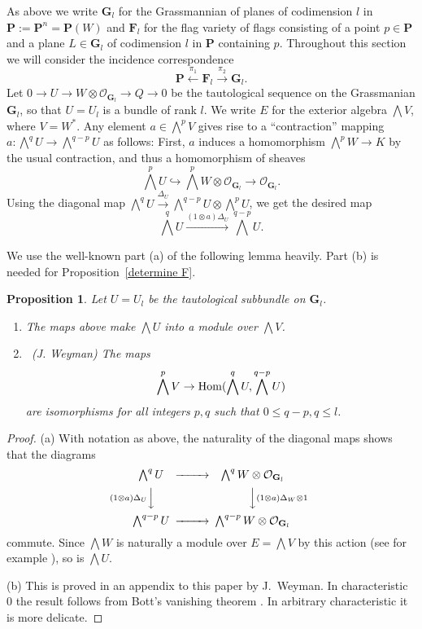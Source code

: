 \documentclass{jams-l}
\newtheorem{proposition}[theorem]{Proposition}
\theoremstyle{definition}
\theoremstyle{remark}
\newcommand{\FF}{{\mathbf F}}
\newcommand{\GG}{{\mathbf G}}
\newcommand{\Ocal}{{\mathcal O}}
\newcommand{\PP}{{\mathbf P}}
\newcommand{\tensor}{\otimes}
\newcommand{\Hom}{{\mathop{\rm Hom}\nolimits}}
\newcommand{\rTo}{\xrightarrow}
\newcommand{\lTo}{\xleftarrow}
\newcommand{\rTox}{\rightarrow}
\begin{document}
As above we
write $\GG_l$ for the Grassmannian of 
planes of codimension $l$ in $\PP:=\PP^n=\PP(W)$
and   $\FF_l$ for the flag variety
of flags consisting of a point $p \in \PP$ and a
plane $L\in \GG_l$ of codimension $l$ in $\PP$
containing $p$. Throughout this section
we will consider the incidence correspondence
\[
\PP \lTo{\pi_1} \FF_l  \rTo{\pi_2} \GG_l.
\]
Let $0 \rTox U \rTox W \tensor \Ocal_{\GG_l}  \rTox Q \rTox 0$
be the tautological sequence on the Grassmanian $\GG_l$,
so that $U=U_l$ is a bundle of rank $l$. We write $E$ for the
exterior algebra $\bigwedge V$, where $V=W^*$. Any element
$a\in \bigwedge^p V$ gives rise to a ``contraction'' mapping
$a: \bigwedge^qU \to \bigwedge^{q-p}U$ as follows: 
First, $a$ induces a homomorphism
$\bigwedge^pW\to K$ by the usual contraction,
and thus a homomorphism of sheaves
\[
\bigwedge^pU\hookrightarrow 
\bigwedge^pW\tensor \Ocal_{\GG_l} \to 
\Ocal_{\GG_l}.
\]
Using the diagonal map \cite[A2.4, p.~582]{Eisenbud 1995}
$\bigwedge^q U\rTo{\Delta_U}\bigwedge^{q-p}U\otimes\bigwedge^pU$,
we get the desired map
\[
\bigwedge^qU\rTo{(1\tensor a)\Delta_U}\bigwedge^{q-p}U.
\]

We use the well-known part (a) of the following lemma
heavily. Part (b) is needed for Proposition~\ref{determine F}.

\begin{proposition}\label{Hom computation} Let $U=U_l$ be the tautological
subbundle on $\GG_l$.
\begin{enumerate}
\item[(a)] The maps above make
$\bigwedge U$ into a module over $\bigwedge V$. 
\item[(b)]{\rm\ (J. Weyman)} The maps
\[
\bigwedge^pV \to \Hom(\bigwedge^q U, \bigwedge^{q-p}U)
\]
are isomorphisms for all integers 
$p,q$ such that $0\leq q{-}p,q\leq l$.
\end{enumerate}
\end{proposition}

\begin{proof} (a) With notation as above,
the naturality of the diagonal maps shows that the 
diagrams
\[
\begin{CD}
\bigwedge^qU& @>>>& \bigwedge^qW\otimes \Ocal_{\GG_l}\\
@V{(1\tensor a)\Delta_U}VV && @VV{(1\tensor a)\Delta_W}\tensor 1V\\
\bigwedge^{q-p}U& @>>> &
\bigwedge^{q-p}W\tensor\Ocal_{\GG_l}
\end{CD}
\]
commute. Since $\bigwedge W$ is  naturally a module over $E=\bigwedge V$
by this action
(see for example \cite[Appendix A2.4.1]{Eisenbud 1995}), so is $\bigwedge U$.

\medbreak
(b) This is proved in an appendix to this
paper by J.~Weyman. In characteristic 0 the result follows
from Bott's vanishing
theorem \cite{Jantzen 1987}. In arbitrary characteristic it is more delicate.
\end{proof}
\end{document}
